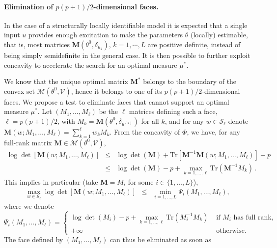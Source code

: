 \documentclass[a4paper]{article}
\newcommand{\Luc}{\color{magenta} }
\theoremstyle{definition}
\theoremstyle{remark}
\newcommand{\Tr}{\mathrm{Tr}}
\newcommand{\V}{\mathcal{V}}
\newcommand{\Mb}{\mathbf{M}}
\renewcommand{\S}{\mathcal{S}}
\begin{document}
\paragraph{Elimination of $p(p+1)/2$-dimensional faces.}
{\Luc In the case of a structurally locally identifiable model %
it is expected that a single input $u$ provides enough excitation to make the parameters $\theta$ (locally) estimable, that is, most matrices $\Mb(\theta^0,\delta_{u_k})$, $k=1,\cdots,L$ are positive definite, instead of being simply semidefinite in the general case. It is then possible to further exploit concavity to accelerate the search for an optimal measure $\mu^*$.

We know that the unique optimal matrix 
$\Mb^*$
belongs to the boundary of the convex set $\mathcal{M}(\theta^0,\V)$, hence it belongs to one of its  $p(p+1)/2$-dimensional faces. 
We propose a test to eliminate faces that cannot support an optimal measure $\mu^*$. Let $(M_1,\dots , M_\ell)$ be the $\ell$ matrices defining such a face, $\ell = p(p+1)/2$, with $M_k=\Mb(\theta^0,\delta_{u^{(k)}})$ for all $k$, and for 
any $w\in\S_\ell$ denote $\Mb(w;M_1,\dots , M_\ell)=\sum_{k=1}^\ell w_k M_k$.
From the concavity of $\Phi$, we have, for any full-rank matrix $\Mb\in\mathcal{M}(\theta^0,\V)$,
\begin{eqnarray*}
\log\det \left[\Mb(w;M_1,\dots, M_\ell)\right] &\leq& \log\det(\Mb) + \Tr\left[\Mb^{-1}\Mb(w;M_1,\dots, M_\ell)\right] - p \\
&\leq& \log\det(\Mb) -p  + \max_{k=1,\ldots,\ell} \Tr(\Mb^{-1}M_k) \,.
\end{eqnarray*}
This implies in particular (take $\Mb=M_i$ for some $i\in\{1,\ldots,L\}$),
\begin{eqnarray*}
\max_{w\in\S_\ell} \log\det \left[\Mb(w;M_1,\dots, M_\ell)\right] &\leq&  \min_{i=1,\ldots,L} \Psi_i(M_1,\dots , M_\ell),
\end{eqnarray*}
where we denote 
$$
\Psi_i(M_1,\dots , M_\ell) = \left\{\begin{array}{ll}
    \log\det(M_i) - p + \max_{k=1,\ldots,\ell} \Tr(M_i^{-1}M_k)  &  \mbox{ if }  M_i \mbox{ has full rank,}\\
    +\infty & \mbox{ otherwise.} 
\end{array}
\right.
$$
The face defined by $(M_1,\dots , M_\ell)$ can thus be eliminated as soon as 
}
\end{document}
